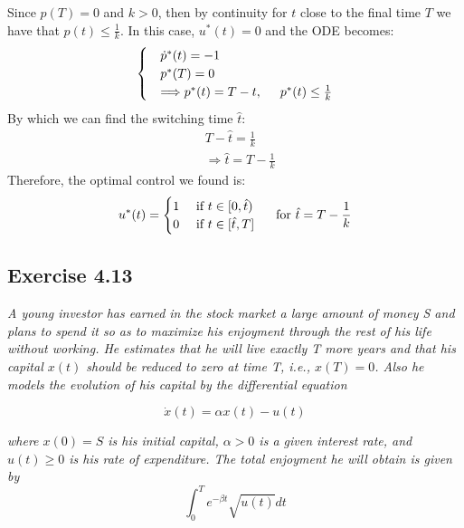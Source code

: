 Since $p(T) = 0$ and $k > 0$, then by continuity for $t$ close to the final time $T$ we have that $p(t) \leq \frac{1}{k}$. In this case, $u^*(t) = 0$ and the ODE becomes:
\begin{equation}
    \begin{cases}
        &\Dot{p}^*(t) = -1\\
        &p^*(T) =0\\
        &\Longrightarrow p^*(t) = T - t, \hspace{0.5cm} p^*(t) \leq \frac{1}{k}
    \end{cases}
\end{equation}
By which we can find the switching time $\hat{t}$:
\begin{align}
    &T - \hat{t} = \frac{1}{k}\\
    &\Longrightarrow \hat{t} = T - \frac{1}{k}
\end{align}
Therefore, the optimal control we found is:
\begin{equation}
    u^*(t) = \begin{cases}
        1 &\text{ if } t \in [0, \hat{t}) \\
        0 &\text{ if } t \in [\hat{t}, T]\\
    \end{cases} 
    \hspace{0.5cm} \text{for } \hat{t} = T - \frac{1}{k}
\end{equation}
    

\subsection{Exercise 4.13}
\emph{A young investor has earned in the stock market a large amount of  money S and plans to spend it so as to maximize his enjoyment through the rest of his life without working. He estimates that he will live exactly T more years and that his capital $x(t)$ should be reduced to zero at time T, i.e., $x(T) = 0$. Also he models the evolution of his capital by the differential equation}

\begin{equation}
    \Dot{x}(t) = \alpha x(t) - u(t)
\end{equation}

\emph{where $x(0) = S$ is his initial capital, $\alpha > 0$ is a given interest rate, and $u(t) \geq 0 $ is his rate of expenditure. The total enjoyment he will obtain is given by }
\begin{equation}
    \int_0^T e^{-\beta t} \sqrt{u(t)}dt
\end{equation}

